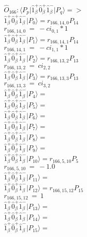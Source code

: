 \documentclass[14pt]{article}
\begin{document}
    $\hat{O}_{166}:  \langle{P_p}\vert \hat{1}_{\beta}^{+}\hat{0}_{\beta}^{+}\hat{1}_{\beta}^{-} \vert{P_q}\rangle => $ \\ 
    $ \hat{1}_{\beta}^{+}\hat{0}_{\beta}^{+}\hat{1}_{\beta}^{-} \vert{P_{0}}\rangle = {r}_{166,14,0}P_{14} $ \\ 
    ${r}_{166,14,0}\ =\ -{ci}_{0,1}*1 $ \\ 
    $ \hat{1}_{\beta}^{+}\hat{0}_{\beta}^{+}\hat{1}_{\beta}^{-} \vert{P_{1}}\rangle = {r}_{166,14,1}P_{14} $ \\ 
    ${r}_{166,14,1}\ =\ -{ci}_{1,1}*1 $ \\ 
    $ \hat{1}_{\beta}^{+}\hat{0}_{\beta}^{+}\hat{1}_{\beta}^{-} \vert{P_{2}}\rangle = {r}_{166,13,2}P_{13} $ \\ 
    ${r}_{166,13,2}\ =\ {ci}_{2,2} $ \\ 
    $ \hat{1}_{\beta}^{+}\hat{0}_{\beta}^{+}\hat{1}_{\beta}^{-} \vert{P_{3}}\rangle = {r}_{166,13,3}P_{13} $ \\ 
    ${r}_{166,13,3}\ =\ {ci}_{3,2} $ \\ 
    $ \hat{1}_{\beta}^{+}\hat{0}_{\beta}^{+}\hat{1}_{\beta}^{-} \vert{P_{4}}\rangle =  $ \\ 
    $ \hat{1}_{\beta}^{+}\hat{0}_{\beta}^{+}\hat{1}_{\beta}^{-} \vert{P_{5}}\rangle =  $ \\ 
    $ \hat{1}_{\beta}^{+}\hat{0}_{\beta}^{+}\hat{1}_{\beta}^{-} \vert{P_{6}}\rangle =  $ \\ 
    $ \hat{1}_{\beta}^{+}\hat{0}_{\beta}^{+}\hat{1}_{\beta}^{-} \vert{P_{7}}\rangle =  $ \\ 
    $ \hat{1}_{\beta}^{+}\hat{0}_{\beta}^{+}\hat{1}_{\beta}^{-} \vert{P_{8}}\rangle =  $ \\ 
    $ \hat{1}_{\beta}^{+}\hat{0}_{\beta}^{+}\hat{1}_{\beta}^{-} \vert{P_{9}}\rangle =  $ \\ 
    $ \hat{1}_{\beta}^{+}\hat{0}_{\beta}^{+}\hat{1}_{\beta}^{-} \vert{P_{10}}\rangle = {r}_{166,5,10}P_{5} $ \\ 
    ${r}_{166,5,10}\ =\ -1.0 $ \\ 
    $ \hat{1}_{\beta}^{+}\hat{0}_{\beta}^{+}\hat{1}_{\beta}^{-} \vert{P_{11}}\rangle =  $ \\ 
    $ \hat{1}_{\beta}^{+}\hat{0}_{\beta}^{+}\hat{1}_{\beta}^{-} \vert{P_{12}}\rangle = {r}_{166,15,12}P_{15} $ \\ 
    ${r}_{166,15,12}\ =\ 1 $ \\ 
    $ \hat{1}_{\beta}^{+}\hat{0}_{\beta}^{+}\hat{1}_{\beta}^{-} \vert{P_{13}}\rangle =  $ \\ 
    $ \hat{1}_{\beta}^{+}\hat{0}_{\beta}^{+}\hat{1}_{\beta}^{-} \vert{P_{14}}\rangle =  $ \\ 
    $ \hat{1}_{\beta}^{+}\hat{0}_{\beta}^{+}\hat{1}_{\beta}^{-} \vert{P_{15}}\rangle =  $ \\ 
    
\end{document}
